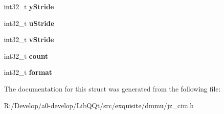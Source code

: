 \begin{DoxyCompactItemize}
\item 
\mbox{\label{struct_camera_y_u_v_meta_aca8c05aed07c145db62df981ba82bc55}} 
int32\+\_\+t {\bfseries y\+Stride}
\item 
\mbox{\label{struct_camera_y_u_v_meta_a6f9de23c70895a1b3458f194a8f0e5b9}} 
int32\+\_\+t {\bfseries u\+Stride}
\item 
\mbox{\label{struct_camera_y_u_v_meta_a867168e1abc2bd593287a20ef1289e69}} 
int32\+\_\+t {\bfseries v\+Stride}
\item 
\mbox{\label{struct_camera_y_u_v_meta_a71993dd3e07652b818d9a422f3bd0ce1}} 
int32\+\_\+t {\bfseries count}
\item 
\mbox{\label{struct_camera_y_u_v_meta_abd1a6dd09be175f90855cb5ba57fcd97}} 
int32\+\_\+t {\bfseries format}
\end{DoxyCompactItemize}


The documentation for this struct was generated from the following file\+:\begin{DoxyCompactItemize}
\item 
R\+:/\+Develop/a0-\/develop/\+Lib\+Q\+Qt/src/exquisite/dmmu/jz\+\_\+cim.\+h\end{DoxyCompactItemize}
